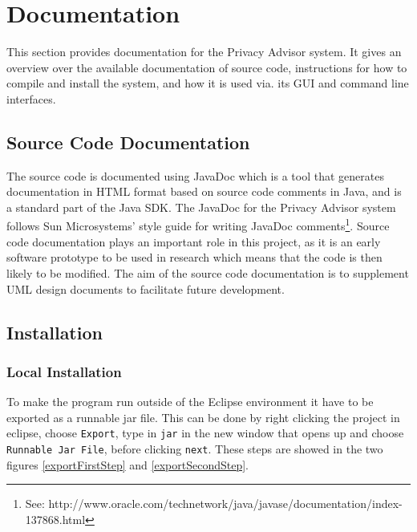  

\chapter{Documentation}\label{doc}

\minitoc

This section provides documentation for the Privacy Advisor system. It gives an overview over the available documentation of source code, instructions for how to compile and install the system, and how it is used via. its GUI and command line interfaces.

\section{Source Code Documentation} 

The source code is documented using JavaDoc which is 	a tool that generates documentation in HTML format based on source code comments in Java, and is a standard part of the Java SDK. The JavaDoc for the Privacy Advisor system follows Sun Microsystems' style guide for writing JavaDoc comments\footnote{See: http://www.oracle.com/technetwork/java/javase/documentation/index-137868.html}. Source code documentation plays an important role in this project, as it is an early software prototype to be used in research which means that the code is then likely to be modified. The aim of the source code documentation is to supplement UML design documents to facilitate future development.

\section{Installation}

\subsection{Local Installation} \label{LocalInst}
To make the program run outside of the Eclipse environment it have to be exported as a runnable jar file. This can be done by right clicking the project in eclipse, choose \texttt{Export}, type in \texttt{jar} in the new window that opens up and choose \texttt{Runnable Jar File}, before clicking \texttt{next}. These steps are showed in the two figures \ref{exportFirstStep} and \ref{exportSecondStep}.

